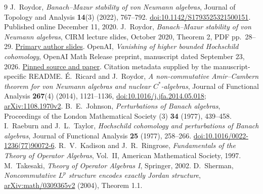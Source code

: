 \documentclass[11pt]{article}
\begin{document}
\begin{thebibliography}{9}
J.~Roydor, \emph{Banach--Mazur stability of von Neumann algebras},
Journal of Topology and Analysis \textbf{14}(3) (2022), 767--792.
\href{https://doi.org/10.1142/S1793525321500151}{doi:10.1142/S1793525321500151}.
Published online December 11, 2020.
J.~Roydor, \emph{Banach--Mazur stability of von Neumann algebras},
CIRM lecture slides, October 2020, Theorem 2, PDF pp.~28--29.
\href{https://www.cirm-math.fr/RepOrga/2169/Slides/Roydor_Slides.pdf}{Primary author slides}.
OpenAI, \emph{Vanishing of higher bounded Hochschild cohomology},
OpenAI Math Release preprint, manuscript dated September 23, 2026.
\href{https://github.com/openai/math/blob/adc7f1241b42e322a6451854ab7e4b4c146bf78a/preprints/Vanishing-of-higher-bounded-Hochschild-cohomology-September-23-2026/paper.pdf}{Pinned source and paper}.
Citation metadata supplied by the manuscript-specific README.
\'{E}.~Ricard and J.~Roydor, \emph{A non-commutative Amir--Cambern
theorem for von Neumann algebras and nuclear $C^*$-algebras},
Journal of Functional Analysis \textbf{267}(4) (2014), 1121--1136,
\href{https://doi.org/10.1016/j.jfa.2014.05.018}{doi:10.1016/j.jfa.2014.05.018};
\href{https://arxiv.org/abs/1108.1970v2}{arXiv:1108.1970v2}.
B.~E.~Johnson, \emph{Perturbations of Banach algebras},
Proceedings of the London Mathematical Society (3) \textbf{34}
(1977), 439--458.
I.~Raeburn and J.~L.~Taylor, \emph{Hochschild cohomology and
perturbations of Banach algebras}, Journal of Functional Analysis
\textbf{25} (1977), 258--266.
\href{https://doi.org/10.1016/0022-1236(77)90072-6}{doi:10.1016/0022-1236(77)90072-6}.
R.~V.~Kadison and J.~R.~Ringrose, \emph{Fundamentals of the Theory of
Operator Algebras}, Vol.~II, American Mathematical Society, 1997.
M.~Takesaki, \emph{Theory of Operator Algebras I}, Springer, 2002.
D.~Sherman, \emph{Noncommutative $L^p$ structure encodes exactly Jordan
structure}, \href{https://arxiv.org/abs/math/0309365}{arXiv:math/0309365v2}
(2004), Theorem 1.1.
\end{thebibliography}
\end{document}
